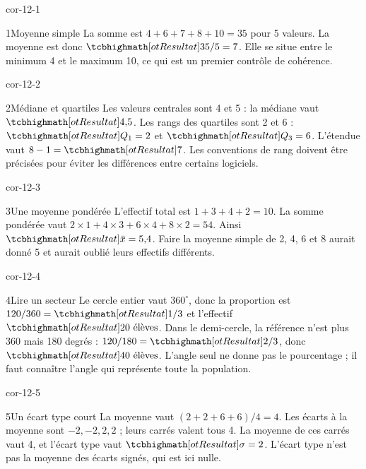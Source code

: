 \clearpage\pagestyle{otMain}\fontsize{11}{15}\selectfont
{}
\begin{blocLivre}{cor-12-1}
\begin{corrige}{1}{Moyenne simple}
La somme est $4+6+7+8+10=35$ pour 5 valeurs. La moyenne est donc $\res{35/5=7}$. Elle se situe entre le minimum 4 et le maximum 10, ce qui est un premier contrôle de cohérence.
\end{corrige}
\end{blocLivre}
\begin{blocLivre}{cor-12-2}
\begin{corrige}{2}{Médiane et quartiles}
Les valeurs centrales sont 4 et 5 : la médiane vaut $\res{4{,}5}$. Les rangs des quartiles sont 2 et 6 : $\res{Q_1=2}$ et $\res{Q_3=6}$. L’étendue vaut $8-1=\res7$. Les conventions de rang doivent être précisées pour éviter les différences entre certains logiciels.
\end{corrige}
\end{blocLivre}
\begin{blocLivre}{cor-12-3}
\begin{corrige}{3}{Une moyenne pondérée}
L’effectif total est $1+3+4+2=10$. La somme pondérée vaut $2\times1+4\times3+6\times4+8\times2=54$. Ainsi $\res{\bar x=5{,}4}$. Faire la moyenne simple de 2, 4, 6 et 8 aurait donné 5 et aurait oublié leurs effectifs différents.
\label{fig-cor-12-3}
\end{corrige}
\end{blocLivre}
\begin{blocLivre}{cor-12-4}
\begin{corrige}{4}{Lire un secteur}
Le cercle entier vaut $360^\circ$, donc la proportion est $120/360=\res{1/3}$ et l’effectif $\res{20\text{ élèves}}$. Dans le demi-cercle, la référence n’est plus 360 mais 180 degrés : $120/180=\res{2/3}$, donc $\res{40\text{ élèves}}$. L’angle seul ne donne pas le pourcentage ; il faut connaître l’angle qui représente toute la population.
\label{fig-cor-12-4}
\end{corrige}
\end{blocLivre}
\begin{blocLivre}{cor-12-5}
\begin{corrige}{5}{Un écart type court}
La moyenne vaut $(2+2+6+6)/4=4$. Les écarts à la moyenne sont $-2,-2,2,2$ ; leurs carrés valent tous 4. La moyenne de ces carrés vaut 4, et l’écart type vaut $\res{\sigma=2}$. L’écart type n’est pas la moyenne des écarts signés, qui est ici nulle.
\end{corrige}
\end{blocLivre}
